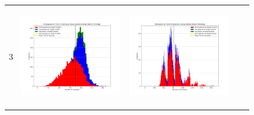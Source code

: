 \begin{landscape}
\begin{table}[h!]
\begin{tabular}{ | c | c | c | c | c |}
    3 & \vline
    \begin{minipage}[c][45mm][c]{45mm}
      \includegraphics[width=44mm, height=44mm]{Chapters/MultiAgentTargetDetection/Figs/Histograms/MultipleAgent/3/3EpsilonGreedyHistogram.png}
    \end{minipage}
    &
    \begin{minipage}[c][45mm][c]{45mm}
      \includegraphics[width=44mm, height=44mm]{Chapters/MultiAgentTargetDetection/Figs/Histograms/MultipleAgent/3/3SweepHistogram.png}


\end{minipage}
\end{tabular}
\end{table}
\end{landscape}
